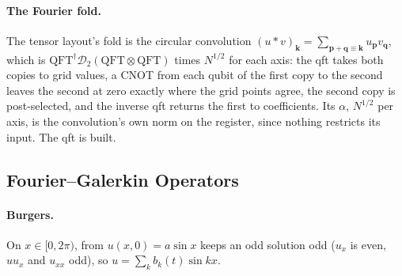 \paragraph{The Fourier fold.} The tensor layout's fold is the circular convolution $(u*v)_{\mathbf k}=\sum_{\mathbf p+\mathbf q\equiv\mathbf k}u_{\mathbf p}v_{\mathbf q}$, which is $\mathrm{QFT}^\dagger\mathcal{D}_2(\mathrm{QFT}\otimes\mathrm{QFT})$ times $N^{1/2}$ for each axis: the \gls{qft} takes both copies to grid values, a CNOT from each qubit of the first copy to the second leaves the second at zero exactly where the grid points agree, the second copy is post-selected, and the inverse \gls{qft} returns the first to coefficients. Its $\alpha$, $N^{1/2}$ per axis, is the convolution's own norm on the register, since nothing restricts its input. The \gls{qft} is built.

\subsection{Fourier--Galerkin Operators}
\label{app:fluids}

\paragraph{Burgers.} On $x\in[0,2\pi)$,  from $u(x,0)=a\sin x$ keeps an odd solution odd ($u_x$ is even, $uu_x$ and $u_{xx}$ odd), so $u=\sum_kb_k(t)\sin kx$.

